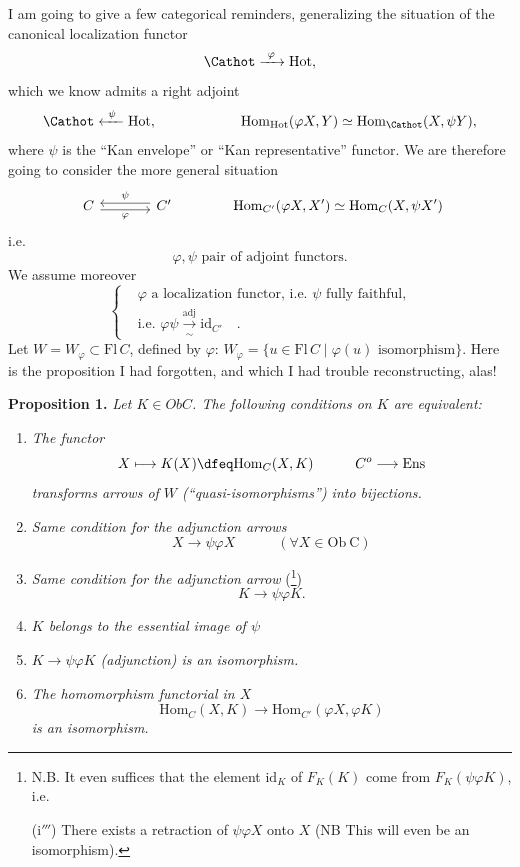 I am going to give a few categorical reminders, generalizing the situation of the canonical localization functor
\[
\Cathot\xrightarrow{\ \varphi\ }\mathrm{Hot},
\]
which we know admits a right adjoint 
\[
\Cathot\xleftarrow{\ \psi\ }\mathrm{Hot}, \qquad\qquad\qquad \mathrm{Hom}_{\mathrm{Hot}}(\varphi X,Y)\simeq\mathrm{Hom}_{\Cathot}(X,\psi Y),
\]
where $\psi$ is the ``Kan envelope'' or ``Kan representative'' functor. We are therefore going to consider the more general situation
\[
\begin{tikzcd}[column sep=large]
C \arrow[r, shift right=1, "\varphi"'] & C' \arrow[l, shift right=1, "\psi"']
\end{tikzcd}
\qquad\qquad \mathrm{Hom}_{C'}(\varphi X,X')\simeq\mathrm{Hom}_{C}(X,\psi X')
\]
i.e.
\[
\varphi,\psi \text{ pair of adjoint functors.}
\]
We assume moreover
\[
\left\{
\begin{aligned}
&\varphi \text{ a localization functor, i.e. } \psi \text{ fully faithful,}\\
&\text{i.e. } \varphi\psi\xrightarrow[\sim]{\text{adj}}\mathrm{id}_{C'} \quad .
\end{aligned}
\right.
\]
Let $W=W_{\varphi}\subset\mathrm{Fl}\,C$, defined by $\varphi$: $W_{\varphi}=\{u\in\mathrm{Fl}\,C\mid\varphi(u)\text{ isomorphism}\}$. Here is the proposition I had forgotten, and which I had trouble reconstructing, alas!

\textbf{Proposition 1.} \textit{Let $K\in \mathit{Ob}C$. The following conditions on $K$ are equivalent:}


\begin{enumerate}
\item[(i)] \textit{The functor}
\[
X\longmapsto K(X)\dfeq\mathrm{Hom}_C(X,K) \qquad\quad C^{o}\longrightarrow\mathrm{Ens}
\]
\textit{transforms arrows of $W$ (``quasi-isomorphisms'') into bijections.}
\item[(i$'$)] \textit{Same condition for the adjunction arrows}
\[
X\longrightarrow\psi\varphi X \qquad\quad (\forall X\in\mathrm{Ob}\ \mathrm{C})
\]
\item[(i$''$)] \textit{Same condition for the adjunction arrow} (\footnote[6]{N.B. It even suffices that the element $\mathrm{id}_K$ of $F_K(K)$ come from $F_K(\psi\varphi K)$, i.e.\par (i$'''$) There exists a retraction of $\psi\varphi X$ onto $X$ (NB This will even be an isomorphism).})
\[
K\longrightarrow\psi\varphi K.
\]
\item[(ii)] \textit{$K$ belongs to the essential image of $\psi$}
\item[(ii$'$)] \textit{$K\longrightarrow\psi\varphi K$ (adjunction) is an isomorphism.}
\item[(ii$''$)] \textit{The homomorphism functorial in $X$}
\[
\mathrm{Hom}_C(X,K)\longrightarrow\mathrm{Hom}_{C'}(\varphi X,\varphi K)
\]
\textit{is an isomorphism.}
\end{enumerate}

